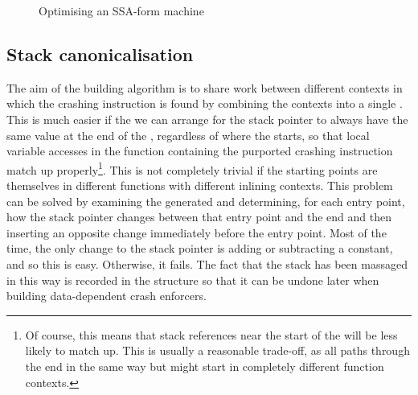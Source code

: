 \begin{figure}
\caption{Optimising an SSA-form machine}
\label{fig:ssa_cfg1}
\end{figure}

\subsection{Stack canonicalisation}

The aim of the {\StateMachine} building algorithm is to share work
between different contexts in which the crashing instruction is found
by combining the contexts into a single {\StateMachine}.  This is much
easier if the we can arrange for the stack pointer to always have the
same value at the end of the {\StateMachine}, regardless of where the
{\StateMachine} starts, so that local variable accesses in the
function containing the purported crashing instruction match up
properly\footnote{Of course, this means that stack references near the
  start of the {\StateMachine} will be less likely to match up.  This
  is usually a reasonable trade-off, as all paths through the
  {\StateMachine} end in the same way but might start in completely
  different function contexts.}.  This is not completely trivial if
the starting points are themselves in different functions with
different inlining contexts.  This problem can be solved by examining
the generated {\StateMachine} and determining, for each entry point,
how the stack pointer changes between that entry point and the end and
then inserting an opposite change immediately before the entry point.
Most of the time, the only change to the stack pointer is adding or
subtracting a constant, and so this is easy.  Otherwise, it fails.
The fact that the stack has been massaged in this way is recorded in
the {\StateMachine} structure so that it can be undone later when
building data-dependent crash enforcers.

